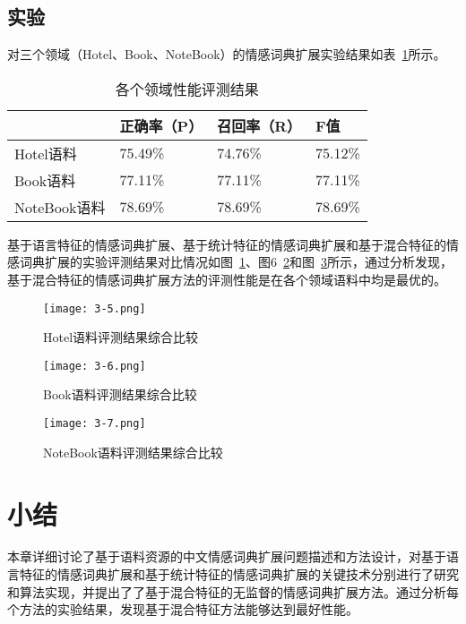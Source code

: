 \subsection{实验}
对三个领域（Hotel、Book、NoteBook）的情感词典扩展实验结果如表~\ref{tab3-3}所示。

\begin{table}[htp]
\centering
\caption{各个领域性能评测结果}
\label{tab3-3}
\begin{tabular}{|l|l|l|l|}
\hline
 &正确率（P）& 召回率（R）& F值 \\
 \hline
 Hotel语料& 75.49\%& 74.76\%& 75.12\% \\
Book语料& 77.11\%& 77.11\%& 77.11\% \\
NoteBook语料&78.69\%& 78.69\%& 78.69\% \\
\hline
\end{tabular}
\end{table}
基于语言特征的情感词典扩展、基于统计特征的情感词典扩展和基于混合特征的情感词典扩展的实验评测结果对比情况如图~\ref{fig3-5}、图6~\ref{fig3-6}和图~\ref{fig3-7}所示，通过分析发现，基于混合特征的情感词典扩展方法的评测性能是在各个领域语料中均是最优的。

\begin{figure}[htp]
\centering
\texttt{[image: 3-5.png]}
\caption{Hotel语料评测结果综合比较}
\label{fig3-5}
\end{figure}

\begin{figure}[htp]
\centering
\texttt{[image: 3-6.png]}
\caption{Book语料评测结果综合比较}
\label{fig3-6}
\end{figure}

\begin{figure}[htp]
\centering
\texttt{[image: 3-7.png]}
\caption{NoteBook语料评测结果综合比较}
\label{fig3-7}
\end{figure}

\section{小结}
本章详细讨论了基于语料资源的中文情感词典扩展问题描述和方法设计，对基于语言特征的情感词典扩展和基于统计特征的情感词典扩展的关键技术分别进行了研究和算法实现，并提出了了基于混合特征的无监督的情感词典扩展方法。通过分析每个方法的实验结果，发现基于混合特征方法能够达到最好性能。
